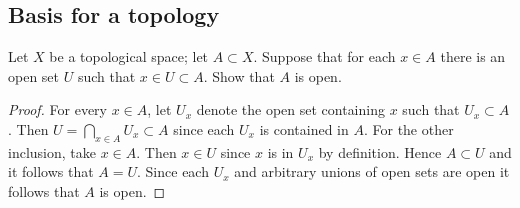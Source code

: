 \subsection{Basis for a topology}
\begin{ex}{13.1}
    Let $X$ be a topological space; let $A\subset X$. Suppose that for each $x\in A$ there is an open set $U$ such that $x\in U\subset A$. Show that $A$ is open.
\end{ex}
\begin{proof}
    For every $x\in A$, let $U_x$ denote the open set containing $x$ such that $U_x\subset A$. Then $U = \bigcap_{x\in A} U_x\subset A$ since each $U_x$ is contained in $A$.
    For the other inclusion, take $x\in A$. Then $x\in U$ since $x$ is in $U_x$ by definition. Hence $A\subset U$ and it follows that $A=U$. 
    Since each $U_x$ and arbitrary unions of open sets are open it follows that $A$ is open.     
\end{proof}

